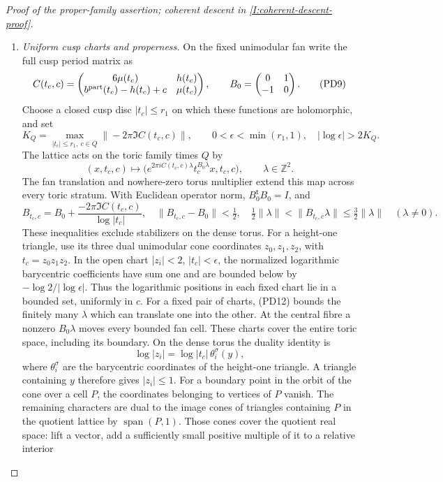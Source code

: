 \begin{proof}[Proof of the proper-family assertion; coherent descent in \cref{I:coherent-descent-proof}]
\begin{enumerate}[label=\arabic*.,leftmargin=*]
\item \emph{Uniform cusp charts and properness.}
On the fixed unimodular fan write the full cusp period matrix as
\[
 C(t_c,c)=\begin{pmatrix}6\mu(t_c)&h(t_c)\\
 b^{\rm part}(t_c)-h(t_c)+c&\mu(t_c)\end{pmatrix},
 \qquad B_0=\begin{pmatrix}0&1\\-1&0\end{pmatrix}.
 \tag{PD9}
\]
Choose a closed cusp disc $|t_c|\le r_1$ on which these functions
are holomorphic, and set
\[
 K_Q=\max_{|t_c|\le r_1,\ c\in\overline Q}
               \|-2\pi\Im C(t_c,c)\|,
 \qquad 0<\epsilon<\min(r_1,1),\quad
               |\log\epsilon|>2K_Q.
 \tag{PD10}
\]
The lattice acts on the toric family times $Q$ by
\[
 (x,t_c,c)\longmapsto
 \bigl(e^{2\pi iC(t_c,c)\lambda}t_c^{B_0\lambda}x,t_c,c\bigr),
 \qquad\lambda\in\mathbb Z^2.
 \tag{PD11}
\]
The fan translation and nowhere-zero torus multiplier extend this
map across every toric stratum. With Euclidean operator norm,
$B_0^{\mathsf t}B_0=I$, and
\[
 B_{t_c,c}=B_0+\frac{-2\pi\Im C(t_c,c)}{\log|t_c|},
 \quad \|B_{t_c,c}-B_0\|<\tfrac12,
 \quad \tfrac12\|\lambda\|<\|B_{t_c,c}\lambda\|
                    \le\tfrac32\|\lambda\|\quad(\lambda\ne0).
 \tag{PD12}
\]
These inequalities exclude stabilizers on the dense torus.
For a height-one triangle, use its three dual unimodular cone
coordinates $z_0,z_1,z_2$, with $t_c=z_0z_1z_2$.
In the open chart $|z_i|<2$, $|t_c|<\epsilon$, the normalized
logarithmic barycentric coefficients have sum one and are bounded
below by $-\log2/|\log\epsilon|$. Thus the logarithmic positions
in each fixed chart lie in a bounded set, uniformly in $c$.
For a fixed pair of charts, (PD12) bounds the finitely many
$\lambda$ which can translate one into the other. At the central
fibre a nonzero $B_0\lambda$ moves every bounded fan cell.
These charts cover the entire toric space, including its boundary.
On the dense torus the duality identity is
\[
 \log|z_i|=\log|t_c|\,\theta_i^\sigma(y),
\]
where $\theta_i^\sigma$ are the barycentric coordinates of the
height-one triangle. A triangle containing $y$ therefore gives
$|z_i|\le1$. For a boundary point in the orbit of the cone over a
cell $P$, the coordinates belonging to vertices of $P$ vanish.
The remaining characters are dual to the image cones of triangles
containing $P$ in the quotient lattice by $\operatorname{span}(P,1)$.
Those cones cover the quotient real space: lift a vector, add a
sufficiently small positive multiple of it to a relative interior

\end{enumerate}
\end{proof}
